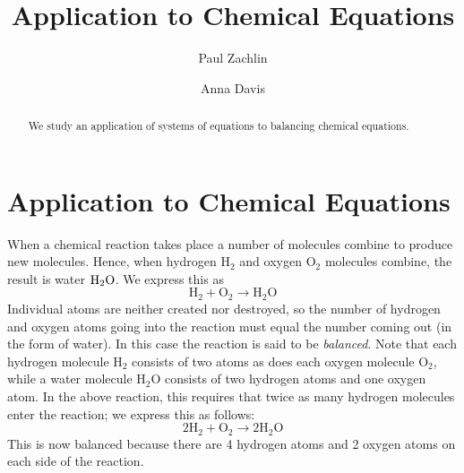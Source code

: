 \documentclass{ximera}
\author{Paul Zachlin \and Anna Davis} \title{Application to Chemical Equations} \license{CC-BY 4.0}
\begin{document}
\begin{abstract}
 We study an application of systems of equations to balancing chemical equations.
\end{abstract}
\maketitle

\section*{Application to Chemical Equations}
When a chemical reaction takes place a number of molecules combine to produce new molecules. Hence, when hydrogen $\mbox{H}_2$ and oxygen $\mbox{O}_2$ molecules combine, the result is water $\mbox{H}\textsubscript{2}\mbox{O}$. We express this as
\begin{equation*}
\mbox{H}_2 + \mbox{O}_2 \rightarrow \mbox{H}_2\mbox{O}
\end{equation*}
Individual atoms are neither created nor destroyed, so the number of hydrogen and oxygen atoms going into the reaction must equal the number coming out (in the form of water). In
this case the reaction is said to be \textit{balanced}. Note that each hydrogen molecule $\mbox{H}_2$ consists of two atoms as does each oxygen molecule $\mbox{O}_2$, while a water molecule $\mbox{H}_2\mbox{O}$ consists of two hydrogen atoms and one oxygen atom. In the above reaction, this requires that twice as many hydrogen molecules enter the reaction; we express this as follows:
\begin{equation*}
2\mbox{H}_2 + \mbox{O}_2 \rightarrow 2\mbox{H}_2\mbox{O}
\end{equation*}
This is now balanced because there are 4 hydrogen atoms and 2 oxygen atoms on each side of the reaction.
\end{document}
